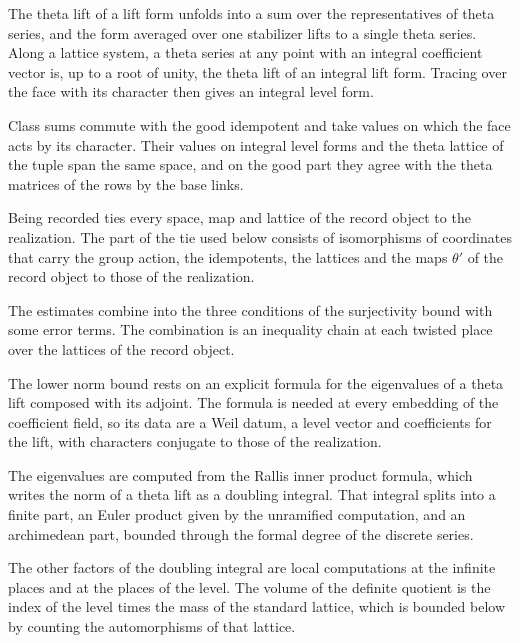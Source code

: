 The theta lift of a lift form unfolds into a sum over the representatives of theta series, and the
form averaged over one stabilizer lifts to a single theta series. Along a lattice system, a theta
series at any point with an integral coefficient vector is, up to a root of unity, the theta lift of
an integral lift form. Tracing over the face with its character then gives an integral level form.

Class sums commute with the good idempotent and take values on which the face acts by its
character. Their values on integral level forms and the theta lattice of the tuple span the same
space, and on the good part they agree with the theta matrices of the rows by the base links.

Being recorded ties every space, map and lattice of the record object to the realization. The part
of the tie used below consists of isomorphisms of coordinates that carry the group action, the
idempotents, the lattices and the maps $\theta'$ of the record object to those of the realization.

The estimates combine into the three conditions of the surjectivity bound with some error terms.
The combination is an inequality chain at each twisted place over the lattices of the record object.

The lower norm bound rests on an explicit formula for the eigenvalues of a theta lift composed with its
adjoint. The formula is needed at every embedding of the coefficient field, so its data are a Weil
datum, a level vector and coefficients for the lift, with characters conjugate to those of the
realization.

The eigenvalues are computed from the Rallis inner product formula, which writes the norm of a theta
lift as a doubling integral. That integral splits into a finite part, an Euler product given by the
unramified computation, and an archimedean part, bounded through the formal degree of the discrete
series.

The other factors of the doubling integral are local computations at the infinite places and at the
places of the level. The volume of the definite quotient is the index of the level times the mass of
the standard lattice, which is bounded below by counting the automorphisms of that lattice.

